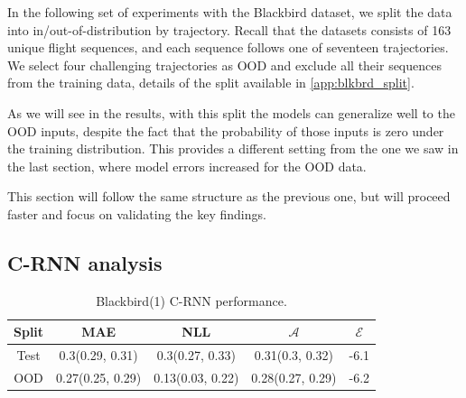 In the following set of experiments with the Blackbird dataset, we split the data into in/out-of-distribution by trajectory. Recall that the datasets consists of 163 unique flight sequences, and each sequence follows one of seventeen trajectories. We select four challenging trajectories as OOD and exclude all their sequences from the training data, details of the split available in \cref{app:blkbrd_split}. 

As we will see in the results, with this split the models can generalize well to the OOD inputs, despite the fact that the probability of those inputs is zero under the training distribution. This provides a different setting from the one we saw in the last section, where model errors increased for the OOD data.

This section will follow the same structure as the previous one, but will proceed faster and focus on validating the key findings. 

\subsection{C-RNN analysis}

\begin{table}[h]
\centering
    \begin{tabular}{c  c  c   c  c }  
        \toprule
        Split & MAE & NLL & $\mathcal{A}$ & $\mathcal{E}$\\
        \midrule
        Test & 0.3(0.29, 0.31) & 0.3(0.27, 0.33) & 0.31(0.3, 0.32) &  -6.1\\
        OOD  &  0.27(0.25, 0.29) &  0.13(0.03, 0.22) & 0.28(0.27, 0.29)&  -6.2\\
        \midrule
    \end{tabular}
    \caption{Blackbird(1) C-RNN performance.}
    \label{tbl:bb1_CRNN}
\end{table}

  
  
  

